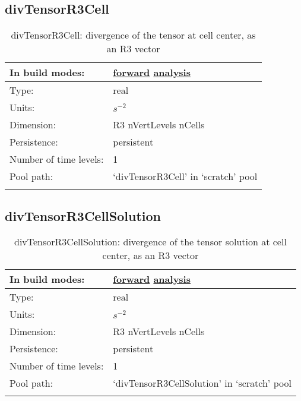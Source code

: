 \subsection[divTensorR3Cell]{divTensorR3Cell}
\label{subsec:var_sec_scratch_divTensorR3Cell}
\begin{center}
\begin{longtable}{| p{2.0in} | p{4.0in} |}
        \hline 
        In build modes: & \hyperref[subsec:forward_var_tab_scratch]{forward} \hyperref[subsec:analysis_var_tab_scratch]{analysis} \\
        \hline 
        Type: & real \\
        \hline 
        Units: & $s^{-2}$ \\
        \hline 
        Dimension: & R3 nVertLevels nCells \\
        \hline 
        Persistence: & persistent \\
        \hline 
        Number of time levels: & 1 \\
        \hline 
            Pool path: & `divTensorR3Cell' in `scratch' pool \\
		 \hline 
    \caption{divTensorR3Cell: divergence of the tensor at cell center, as an R3 vector}
\end{longtable}
\end{center}
\subsection[divTensorR3CellSolution]{divTensorR3CellSolution}
\label{subsec:var_sec_scratch_divTensorR3CellSolution}
\begin{center}
\begin{longtable}{| p{2.0in} | p{4.0in} |}
        \hline 
        In build modes: & \hyperref[subsec:forward_var_tab_scratch]{forward} \hyperref[subsec:analysis_var_tab_scratch]{analysis} \\
        \hline 
        Type: & real \\
        \hline 
        Units: & $s^{-2}$ \\
        \hline 
        Dimension: & R3 nVertLevels nCells \\
        \hline 
        Persistence: & persistent \\
        \hline 
        Number of time levels: & 1 \\
        \hline 
            Pool path: & `divTensorR3CellSolution' in `scratch' pool \\
		 \hline 
    \caption{divTensorR3CellSolution: divergence of the tensor solution at cell center, as an R3 vector}
\end{longtable}
\end{center}
